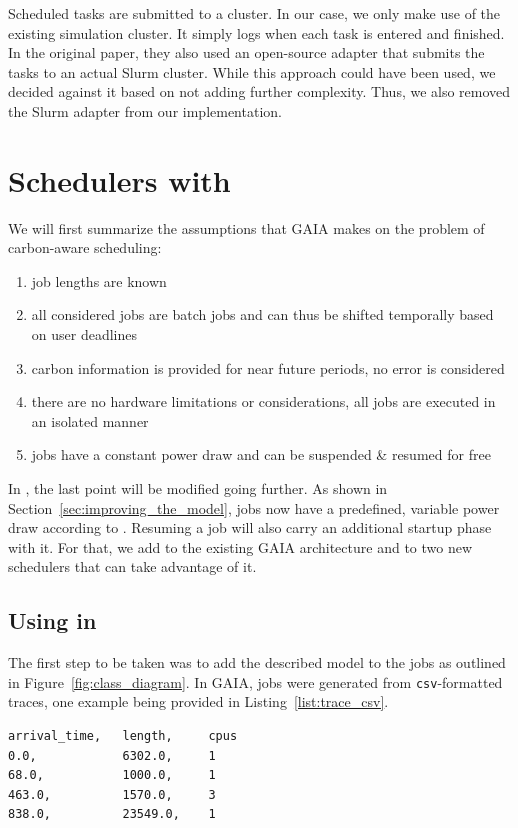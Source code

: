 Scheduled tasks are submitted to a cluster.
In our case, we only make use of the existing simulation cluster. It simply logs when each task is entered and finished. 
In the original paper, they also used an open-source adapter that submits the tasks to an actual Slurm cluster. 
While this approach could have been used, we decided against it based on not adding further complexity. 
Thus, we also removed the Slurm adapter from our implementation.

\chapter{Schedulers with \modelname{}}

We will first summarize the assumptions that GAIA makes on the problem of carbon-aware scheduling:

\begin{enumerate}
    \item job lengths are known
    \item all considered jobs are batch jobs and can thus be shifted temporally based on user deadlines
    \item carbon information is provided for near future periods, no error is considered
    \item there are no hardware limitations or considerations, all jobs are executed in an isolated manner
    \item jobs have a constant power draw and can be suspended \& resumed for free
\end{enumerate}

In \programname{}, the last point will be modified going further. 
As shown in Section~\ref{sec:improving_the_model}, jobs now have a predefined, variable power draw according to \modelname{}. Resuming a job will also carry an additional startup phase with it. 
For that, we add \modelname{} to the existing GAIA architecture and to two new schedulers that can take advantage of it.

\section{Using \modelname{} in \programname{}}

The first step to be taken was to add the described model to the jobs as outlined in Figure~\ref{fig:class_diagram}. 
In GAIA, jobs were generated from \verb|csv|-formatted traces, one example being provided in Listing~\ref{list:trace_csv}.

\begin{minipage}{\linewidth}
\begin{lstlisting}[frame=single, numbers=none, caption={Excerpt from GAIA's Alibaba-PAI cluster trace}, label={list:trace_csv}, basicstyle=\ttfamily]
arrival_time,   length,     cpus
0.0,            6302.0,     1
68.0,           1000.0,     1
463.0,          1570.0,     3
838.0,          23549.0,    1
\end{lstlisting}
\end{minipage}


